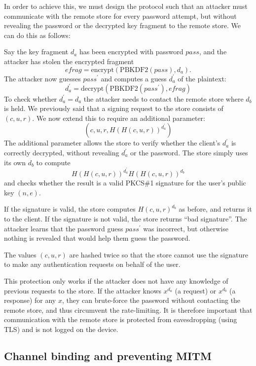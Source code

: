 In order to achieve this, we must design the protocol such that an attacker must communicate with
the remote store for every password attempt, but without revealing the password or the decrypted key
fragment to the remote store. We can do this as follows:

Say the key fragment $d_a$ has been encrypted with password $\mathit{pass}$, and the attacker has
stolen the encrypted fragment
$$\mathit{efrag} = \mathrm{encrypt}(\mathrm{PBKDF2}(\mathit{pass}), d_a).$$
The attacker now guesses $\mathit{pass}^\prime$ and computes a guess $d_a^\prime$ of the plaintext:
$$d_a^\prime = \mathrm{decrypt}(\mathrm{PBKDF2}(\mathit{pass}^\prime), \mathit{efrag})$$
To check whether $d_a^\prime = d_a$ the attacker needs to contact the remote store where $d_b$ is
held. We previously said that a signing request to the store consists of $(c, u, r)$. We now extend
this to require an additional parameter:
$$\left(c, u, r, H(H(c, u, r))^{d_a^\prime}\right)$$
The additional parameter allows the store to verify whether the client's $d_a^\prime$ is correctly
decrypted, without revealing $d_a^\prime$ or the password. The store simply uses its own $d_b$ to
compute $$H(H(c, u, r))^{d_a^\prime}H(H(c, u, r))^{d_b}$$ and checks whether the result is a valid
PKCS\#1 signature for the user's public key $(n, e)$.

If the signature is valid, the store computes $H(c, u, r)^{d_b}$ as before, and returns it to the
client. If the signature is not valid, the store returns ``bad signature''. The attacker learns that
the password guess $\mathit{pass}^\prime$ was incorrect, but otherwise nothing is revealed that
would help them guess the password.

The values $(c, u, r)$ are hashed twice so that the store cannot use the signature to make any
authentication requests on behalf of the user.

This protection only works if the attacker does not have any knowledge of previous requests to the
store. If the attacker knows $x^{d_a}$ (a request) or $x^{d_b}$ (a response) for any $x$, they can
brute-force the password without contacting the remote store, and thus circumvent the rate-limiting.
It is therefore important that communication with the remote store is protected from eavesdropping
(using TLS) and is not logged on the device.

\subsection{Channel binding and preventing MITM}

